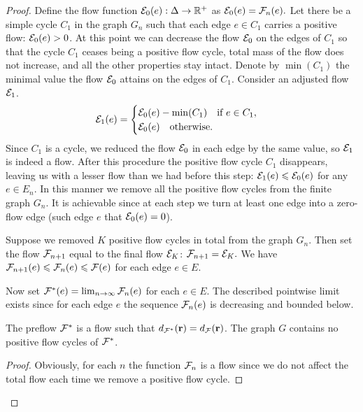 \documentclass[12pt,oneside,a4paper]{amsart}
\begin{document}
\begin{proof}
        Define the flow function $\cal{E}_0(e): \net \to \mathbb{R}^{+}$ as $\cal{E}_0(e) = \flowposn{n}(e).$
        Let there be a simple cycle $C_1$ in the graph $G_n$ such that each edge $e \in C_1$ carries
          a positive flow: $\cal{E}_0(e) > 0$.
        At this point we can decrease the flow $\cal{E}_0$ on the edges of $C_1$ so that the cycle $C_1$
          ceases being a positive flow cycle, total mass of the flow does not increase, and all the other properties stay intact.
        Denote by $\min(C_1)$ the minimal value the flow $\cal{E}_0$ attains on the edges of $C_1$.
        Consider an adjusted flow $\cal{E}_1$.
        \begin{equation*}
          \cal{E}_1(e) =
          \begin{cases}
            \cal{E}_0(e) - \min(C_1) \quad \text{if } e \in C_1,\\
            \cal{E}_0(e) \quad \text{otherwise}.
          \end{cases}
        \end{equation*}
        Since $C_1$ is a cycle, we reduced the flow $\cal{E}_0$ in each edge by the same value,
          so $\cal{E}_1$ is indeed a flow.
        After this procedure the positive flow cycle $C_1$ disappears,
          leaving us with a lesser flow than we had before this step: $\cal{E}_1(e) \leq \cal{E}_0(e)$ for any $e \in E_n.$
        In this manner we remove all the positive flow cycles from the finite graph $G_n$.
        It is achievable since at each step we turn at least one edge into a zero-flow edge (such edge $e$ that $\cal{E}_0(e) = 0$).

        Suppose we removed $K$ positive flow cycles in total from the graph $G_n$.
        Then set the flow $\flowposn{n+1}$ equal to the final flow $\cal{E}_K$: $\flowposn{n+1} = \cal{E}_K.$
        We have $\flowposn{n+1}(e) \leq \flowposn{n}(e) \leq \flowpos(e)$ for each edge $e \in E$.

        Now set $\preflow(e) = \lim_{n \to \infty} \flowposn{n}(e)$ for each $e \in E$.
        The described pointwise limit exists since for each edge $e$ the sequence $\flowposn{n}(e)$ is decreasing and bounded below.
        \begin{prop}
          The preflow $\preflow$ is a flow such that $d_{\preflow}(\root) = d_{\flowpos}(\root)$.
          The graph $G$ contains no positive flow cycles of $\preflow$.
        \end{prop}
        \begin{proof}
          Obviously, for each $n$ the function $\flowposn{n}$ is a flow since we do not affect the total flow each time we remove a positive flow cycle.


\end{proof}
\end{proof}
\end{document}
